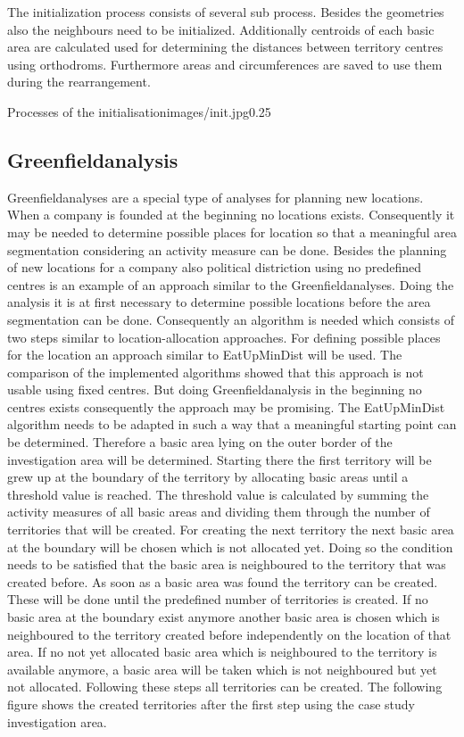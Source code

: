 The initialization process consists of several sub process. Besides the geometries also the neighbours need to be initialized. Additionally centroids of each basic area are calculated used for determining the distances between territory centres using orthodroms. Furthermore areas and circumferences are saved to use them during the rearrangement.

\begin{figurevarSize}{Processes of the initialisation}{images/init.jpg}{0.25}\end{figurevarSize}

\subsection{Greenfieldanalysis}

Greenfieldanalyses are a special type of analyses for planning new locations. When a company is founded at the beginning no locations exists. Consequently it may be needed to determine possible places for location so that a meaningful area segmentation considering an activity measure can be done. Besides the planning of new locations for a company also political distriction using no predefined centres is an example of an approach similar to the Greenfieldanalyses. Doing the analysis it is at first necessary to determine possible locations before the area segmentation can be done. Consequently an algorithm is needed which consists of two steps similar to location-allocation approaches. For defining possible places for the location an approach similar to EatUpMinDist will be used. The comparison of the implemented algorithms showed that this approach is not usable using fixed centres. But doing Greenfieldanalysis in the beginning no centres exists consequently the approach may be promising. The EatUpMinDist algorithm needs to be adapted in such a way that a meaningful starting point can be determined. Therefore a basic area lying on the outer border of the investigation area will be determined. Starting there the first territory will be grew up at the boundary of the territory by allocating basic areas until a threshold value is reached. The threshold value is calculated by summing the activity measures of all basic areas and dividing them through the number of territories that will be created. For creating the next territory the next basic area at the boundary will be chosen which is not allocated yet. Doing so the condition needs to be satisfied that the basic area is neighboured to the territory that was created before. As soon as a basic area was found the territory can be created. These will be done until the predefined number of territories is created. If no basic area at the boundary exist anymore another basic area is chosen which is neighboured to the territory created before independently on the location of that area. If no not yet allocated basic area which is neighboured to the territory is available anymore, a basic area will be taken which is not neighboured but yet not allocated. Following these steps all territories can be created. The following figure shows the created territories after the first step using the case study investigation area.

